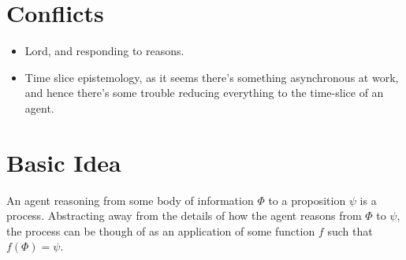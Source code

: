 \documentclass[10pt]{article}
\begin{document}
\section{Conflicts}
\label{sec:conflicts}

\begin{itemize}
\item Lord, and responding to reasons.
\item Time slice epistemology, as it seems there's something asynchronous at work, and hence there's some trouble reducing everything to the time-slice of an agent.
\end{itemize}

\newpage


\section{Basic Idea}
\label{sec:basic-idea}

An agent reasoning from some body of information \(\Phi\) to a proposition \(\psi\) is a process.
Abstracting away from the details of how the agent reasons from \(\Phi\) to \(\psi\), the process can be though of as an application of some function \(f\) such that \(f(\Phi) = \psi\).

\end{document}
